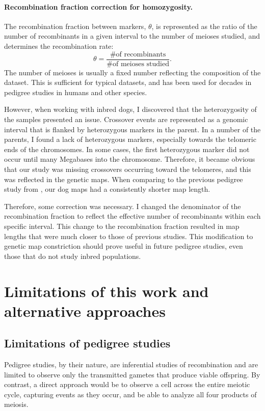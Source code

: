 \paragraph{Recombination fraction correction for homozygosity.}
The recombination fraction between markers, $\theta$, is represented as the ratio of the number of recombinants in a given interval to the number of meioses studied, and determines the recombination rate:
\begin{equation*}
    \theta = \frac{ \text{\# of recombinants} } { \text{\# of meioses studied} } .
\end{equation*}
The number of meioses is usually a fixed number reflecting the composition of the dataset.
This is sufficient for typical datasets, and has been used for decades in pedigree studies in humans and other species.

However, when working with inbred dogs, I discovered that the heterozygosity of the samples presented an issue.
Crossover events are represented as a genomic interval that is flanked by heterozygous markers in the parent.
In a number of the parents, I found a lack of heterozygous markers, especially towards the telomeric ends of the chromosomes.
In some cases, the first heterozygous marker did not occur until many Megabases into the chromosome.
Therefore, it became obvious that our study was missing crossovers occurring toward the telomeres, and this was reflected in the genetic maps.
When comparing to the previous pedigree study from \citet{Wong2010}, our dog maps had a consistently shorter map length.

Therefore, some correction was necessary.
I changed the denominator of the recombination fraction to reflect the effective number of recombinants within each specific interval.
This change to the recombination fraction resulted in map lengths that were much closer to those of previous studies.
This modification to genetic map constriction should prove useful in future pedigree studies, even those that do not study inbred populations.


\section{Limitations of this work and alternative approaches}

\subsection{Limitations of pedigree studies}
Pedigree studies, by their nature, are inferential studies of recombination and are limited to observe only the transmitted gametes that produce viable offspring.
By contrast, a direct approach would be to observe a cell across the entire meiotic cycle, capturing events as they occur, and be able to analyze all four products of meiosis.


